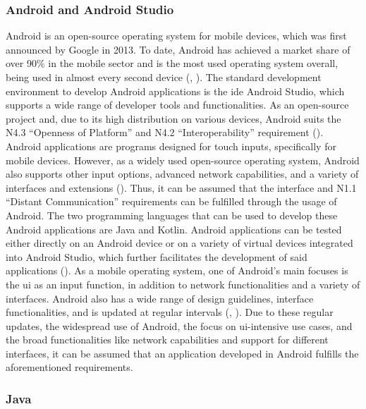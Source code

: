 \subsubsection{Android and Android Studio}

Android is an open-source operating system for mobile devices, which was first announced by Google in 2013. To date, Android has achieved a market share of over 90\% in the mobile sector and is the most used operating system overall, being used in almost every second device (\cite{statcounter.2023}, \cite{Richter.2019}). The standard development environment to develop Android applications is the \ac{ide} Android Studio, which supports a wide range of developer tools and functionalities. As an open-source project and, due to its high distribution on various devices, Android suits the N4.3 \enquote{Openness of Platform} and N4.2 \enquote{Interoperability} requirement (\cite{Richter.2019}). Android applications are programs designed for touch inputs, specifically for mobile devices. However, as a widely used open-source operating system, Android also supports other input options, advanced network capabilities, and a variety of interfaces and extensions (\cite{Richter.2019}). Thus, it can be assumed that the interface and N1.1 \enquote{Distant Communication} requirements can be fulfilled through the usage of Android. The two programming languages that can be used to develop these Android applications are Java and Kotlin. Android applications can be tested either directly on an Android device or on a variety of virtual devices integrated into Android Studio, which further facilitates the development of said applications (\cite{Richter.2019}). As a mobile operating system, one of Android's main focuses is the \ac{ui} as an input function, in addition to network functionalities and a variety of interfaces. Android also has a wide range of design guidelines, interface functionalities, and is updated at regular intervals (\cite{statista.2023}, \cite{Richter.2019}). Due to these regular updates, the widespread use of Android, the focus on \ac{ui}-intensive use cases, and the broad functionalities like network capabilities and support for different interfaces, it can be assumed that an application developed in Android fulfills the aforementioned requirements.

\subsubsection{Java}

